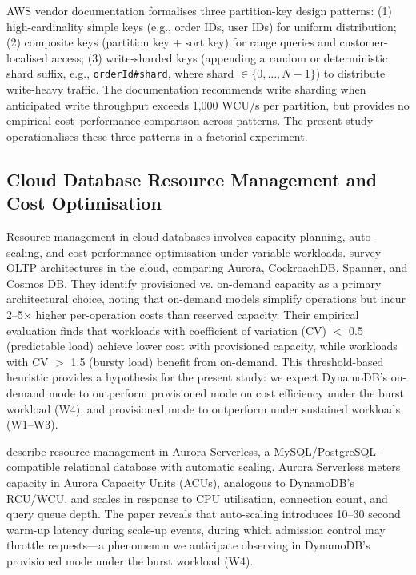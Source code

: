 AWS vendor documentation \citep{aws2025sharding} formalises three partition-key design patterns: (1) high-cardinality simple keys (e.g., order IDs, user IDs) for uniform distribution; (2) composite keys (partition key + sort key) for range queries and customer-localised access; (3) write-sharded keys (appending a random or deterministic shard suffix, e.g., \texttt{orderId\#shard}, where shard $\in \{0, \ldots, N-1\}$) to distribute write-heavy traffic. The documentation recommends write sharding when anticipated write throughput exceeds 1,000 WCU/s per partition, but provides no empirical cost–performance comparison across patterns. The present study operationalises these three patterns in a factorial experiment.

\subsection{Cloud Database Resource Management and Cost Optimisation}

Resource management in cloud databases involves capacity planning, auto-scaling, and cost-performance optimisation under variable workloads. \citet{haubenschild2025oltp} survey OLTP architectures in the cloud, comparing Aurora, CockroachDB, Spanner, and Cosmos DB. They identify provisioned vs. on-demand capacity as a primary architectural choice, noting that on-demand models simplify operations but incur 2–5× higher per-operation costs than reserved capacity. Their empirical evaluation finds that workloads with coefficient of variation (CV) $<$ 0.5 (predictable load) achieve lower cost with provisioned capacity, while workloads with CV $>$ 1.5 (bursty load) benefit from on-demand. This threshold-based heuristic provides a hypothesis for the present study: we expect DynamoDB's on-demand mode to outperform provisioned mode on cost efficiency under the burst workload (W4), and provisioned mode to outperform under sustained workloads (W1–W3).

\citet{barnhart2024aurora} describe resource management in Aurora Serverless, a MySQL/PostgreSQL-compatible relational database with automatic scaling. Aurora Serverless meters capacity in Aurora Capacity Units (ACUs), analogous to DynamoDB's RCU/WCU, and scales in response to CPU utilisation, connection count, and query queue depth. The paper reveals that auto-scaling introduces 10–30 second warm-up latency during scale-up events, during which admission control may throttle requests—a phenomenon we anticipate observing in DynamoDB's provisioned mode under the burst workload (W4).

